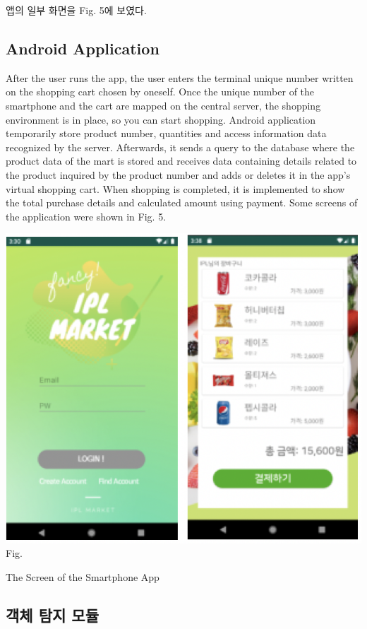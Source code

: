 \documentclass[smallextended]{svjour3}       %
\begin{document}
앱의 일부 화면을 Fig. 5에 보였다.

\hypertarget{android-application}{%
\subsection{Android Application}\label{android-application}}

After the user runs the app, the user enters the terminal unique number
written on the shopping cart chosen by oneself. Once the unique number
of the smartphone and the cart are mapped on the central server, the
shopping environment is in place, so you can start shopping. Android
application temporarily store product number, quantities and access
information data recognized by the server. Afterwards, it sends a query
to the database where the product data of the mart is stored and
receives data containing details related to the product inquired by the
product number and adds or deletes it in the app's virtual shopping
cart. When shopping is completed, it is implemented to show the total
purchase details and calculated amount using payment. Some screens of
the application were shown in Fig. 5.

\includegraphics{../fig/fig5.png} Fig.

The Screen of the Smartphone App

\hypertarget{uxac1duxccb4-uxd0d0uxc9c0-uxbaa8uxb4c8}{%
\subsection{객체 탐지
모듈}\label{uxac1duxccb4-uxd0d0uxc9c0-uxbaa8uxb4c8}}
\end{document}
